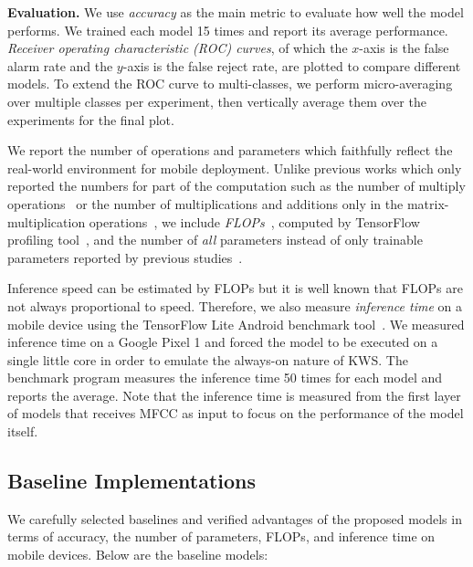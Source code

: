 \documentclass[a4paper]{article}
\begin{document}
\textbf{Evaluation.}
We use \emph{accuracy} as the main metric to evaluate how well the model performs.
We trained each model 15 times and report its average performance.
\emph{Receiver operating characteristic (ROC) curves}, of which the $x$-axis is the false alarm rate and the $y$-axis is the false reject rate, are plotted to compare different models.
To extend the ROC curve to multi-classes, we perform micro-averaging over multiple classes per experiment, then vertically average them over the experiments for the final plot.

We report the number of operations and parameters which faithfully reflect the real-world environment for mobile deployment.
Unlike previous works which only reported the numbers for part of the computation such as the number of multiply operations~\cite{tang-icassp-2018-residual} or the number of multiplications and additions only in the matrix-multiplication operations~\cite{zhang-arxiv-2017-helloedge}, we include \emph{FLOPs}~\cite{arik-arxiv-2018-tensorflowprofiler}, computed by TensorFlow profiling tool~\cite{tensorflow-profile}, and the number of \emph{all} parameters instead of only trainable parameters reported by previous studies~\cite{tang-icassp-2018-residual}.

Inference speed can be estimated by FLOPs but it is well known that FLOPs are not always proportional to speed.
Therefore, we also measure \emph{inference time} on a mobile device using the TensorFlow Lite Android benchmark tool~\cite{tflite-model-benchmark-tool}.
We measured inference time on a Google Pixel 1 and forced the model to be executed on a single little core in order to emulate the always-on nature of KWS.
The benchmark program measures the inference time 50 times for each model and reports the average.
Note that the inference time is measured from the first layer of models that receives MFCC as input to focus on the performance of the model itself.


\subsection{Baseline Implementations}
We carefully selected baselines and verified advantages of the proposed models in terms of accuracy, the number of parameters, FLOPs, and inference time on mobile devices.
Below are the baseline models:
\end{document}
